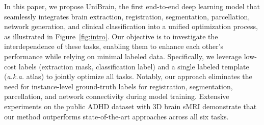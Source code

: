 In this paper, we propose UniBrain, the first end-to-end deep learning model that seamlessly integrates brain extraction, registration, segmentation, parcellation, network generation, and clinical classification into a unified optimization process, as illustrated in Figure~\ref{fig:intro}. Our objective is to investigate the interdependence of these tasks, enabling them to enhance each other's performance while relying on minimal labeled data. Specifically, we leverage low-cost labels (\ie extraction mask, classification label) and a single labeled template (\emph{a.k.a.} atlas) to jointly optimize all tasks. Notably, our approach eliminates the need for instance-level ground-truth labels for registration, segmentation, parcellation, and network connectivity during model training. Extensive experiments on the public ADHD dataset with 3D brain sMRI demonstrate that our method outperforms state-of-the-art approaches across all six tasks.

\vspace{-5pt}
